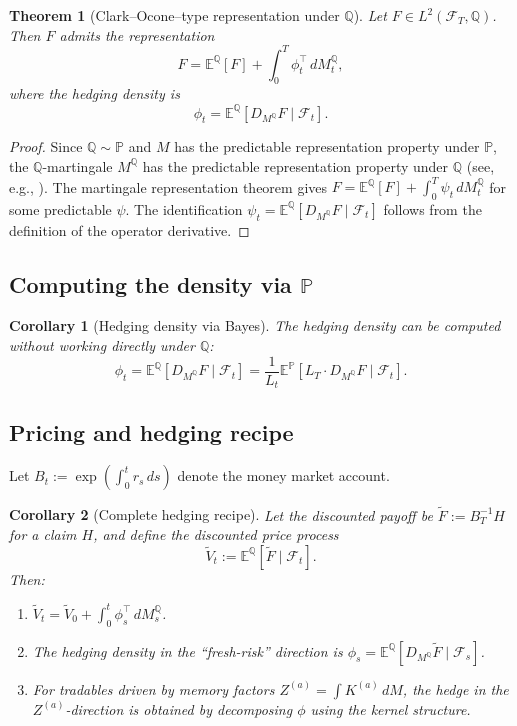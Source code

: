 \documentclass[11pt]{article}
\theoremstyle{plain}
\newtheorem{theorem}{Theorem}[section]
\newtheorem{corollary}{Corollary}[section]
\theoremstyle{definition}
\theoremstyle{remark}
\newcommand{\E}{\mathbb{E}}
\newcommand{\F}{\mathcal{F}}
\newcommand{\PP}{\mathbb{P}}
\newcommand{\QQ}{\mathbb{Q}}
\begin{document}
\begin{theorem}[Clark--Ocone--type representation under $\QQ$]\label{thm:clark-ocone-Q}
Let $F \in L^2(\F_T, \QQ)$. Then $F$ admits the representation
\begin{equation}\label{eq:CO-Q}
F = \E^{\QQ}[F] + \int_0^T \phi_t^\top\,dM_t^{\QQ},
\end{equation}
where the hedging density is
\begin{equation}\label{eq:phi-Q}
\phi_t = \E^{\QQ}[D_{M^{\QQ}} F \mid \F_t].
\end{equation}
\end{theorem}

\begin{proof}
Since $\QQ \sim \PP$ and $M$ has the predictable representation property
under $\PP$, the $\QQ$-martingale $M^{\QQ}$ has the predictable representation
property under $\QQ$ (see, e.g., \cite[Thm.~3.4.34]{KaratzasShreve1991}).
The martingale representation theorem gives
$F = \E^{\QQ}[F] + \int_0^T \psi_t\,dM_t^{\QQ}$ for some
predictable $\psi$. The identification $\psi_t = \E^{\QQ}[D_{M^{\QQ}} F \mid \F_t]$
follows from the definition of the operator derivative.
\end{proof}

\subsection{Computing the density via $\PP$}

\begin{corollary}[Hedging density via Bayes]\label{cor:phi-bayes}
The hedging density can be computed without working directly under $\QQ$:
\begin{equation}\label{eq:phi-bayes}
\phi_t = \E^{\QQ}[D_{M^{\QQ}} F \mid \F_t] = \frac{1}{L_t}\E^{\PP}[L_T \cdot D_{M^{\QQ}} F \mid \F_t].
\end{equation}
\end{corollary}

\subsection{Pricing and hedging recipe}

Let $B_t := \exp(\int_0^t r_s\,ds)$ denote the money market account.

\begin{corollary}[Complete hedging recipe]\label{cor:hedging-recipe}
Let the discounted payoff be $\tilde{F} := B_T^{-1} H$ for a claim $H$, and define the
discounted price process
\[
\tilde{V}_t := \E^{\QQ}[\tilde{F} \mid \F_t].
\]
Then:
\begin{enumerate}[label=(\alph*)]
\item $\tilde{V}_t = \tilde{V}_0 + \int_0^t \phi_s^\top\,dM_s^{\QQ}$.
\item The hedging density in the ``fresh-risk'' direction is
$\phi_s = \E^{\QQ}[D_{M^{\QQ}} \tilde{F} \mid \F_s]$.
\item For tradables driven by memory factors $Z^{(a)} = \int K^{(a)}\,dM$,
the hedge in the $Z^{(a)}$-direction is obtained by decomposing $\phi$
using the kernel structure.
\end{enumerate}
\end{corollary}
\end{document}
